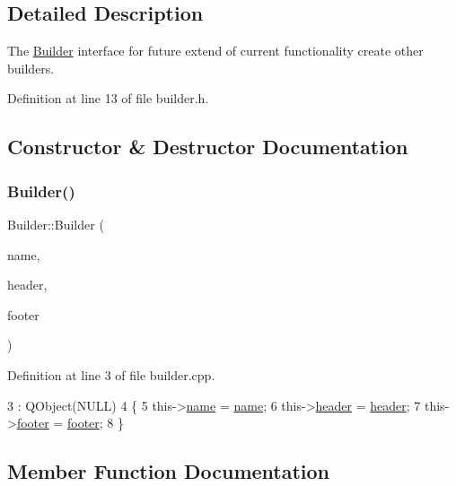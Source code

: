 \subsection{Detailed Description}
The \hyperlink{class_builder}{Builder} interface for future extend of current functionality create other builders. 

Definition at line 13 of file builder.\+h.



\subsection{Constructor \& Destructor Documentation}
\mbox{\label{class_builder_a90a875243096a42ca4069258c52a1ad4}} 
\subsubsection{\texorpdfstring{Builder()}{Builder()}}
{\footnotesize\ttfamily Builder\+::\+Builder (\begin{DoxyParamCaption}\item[{Q\+String}]{name,  }\item[{Q\+String}]{header,  }\item[{Q\+String}]{footer }\end{DoxyParamCaption})}



Definition at line 3 of file builder.\+cpp.


\begin{DoxyCode}
3                                                              : QObject(NULL)
4 \{
5     this->\hyperlink{class_builder_ad8ac906f8ce85ebcd061c4ee8e6f6a01}{name} = \hyperlink{class_builder_ad8ac906f8ce85ebcd061c4ee8e6f6a01}{name};
6     this->\hyperlink{class_builder_ae3800e384b079c2d66ab4d8f98cbb4ad}{header} = \hyperlink{class_builder_ae3800e384b079c2d66ab4d8f98cbb4ad}{header};
7     this->\hyperlink{class_builder_a5ace791b99eb11341d6f39e35fdd2ce7}{footer} = \hyperlink{class_builder_a5ace791b99eb11341d6f39e35fdd2ce7}{footer};
8 \}
\end{DoxyCode}


\subsection{Member Function Documentation}
\mbox{\label{class_builder_a92d31ffc3502acebf0cd074e8b084751}} 
